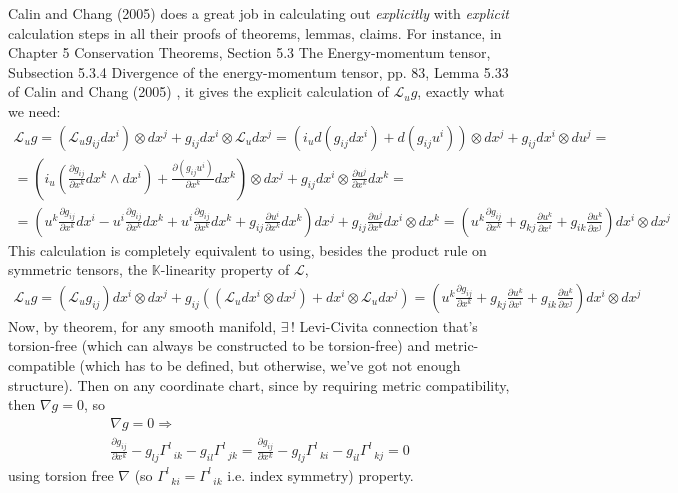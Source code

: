 \documentclass[twoside,landscape,10pt]{amsart}
\theoremstyle{plain}
\theoremstyle{definition}
\theoremstyle{remark}
\theoremstyle{remark}
\begin{document}
\begin{multicols*}{2}
Calin and Chang (2005) \cite{OCalinDChang2005} does a great job in calculating out \emph{explicitly} with \emph{explicit} calculation steps in all their proofs of theorems, lemmas, claims.  For instance, in Chapter 5 Conservation Theorems, Section 5.3 The Energy-momentum tensor, Subsection 5.3.4 Divergence of the energy-momentum tensor, pp. 83, Lemma 5.33 of Calin and Chang (2005) \cite{OCalinDChang2005}, it gives the explicit calculation of $\mathcal{L}_ug$, exactly what we need:
\[
\begin{gathered}
  \mathcal{L}_ug = ( \mathcal{L}_u g_{ij} dx^i ) \otimes dx^j + g_{ij} dx^i \otimes \mathcal{L}_u dx^j = (i_u d(g_{ij} dx^i ) + d(g_{ij}u^i )) \otimes dx^j + g_{ij}dx^i \otimes du^j = \\ 
   = (i_u \left( \frac{ \partial g_{ij}}{ \partial x^k} dx^k \wedge dx^i \right) + \frac{ \partial (g_{ij}u^i )}{ \partial x^k} dx^k ) \otimes dx^j + g_{ij} dx^i \otimes \frac{ \partial u^j}{ \partial x^k} dx^k  = \\
  = \left( u^k \frac{ \partial g_{ij}}{ \partial x^k} dx^i - u^i \frac{ \partial g_{ij} }{ \partial x^k} dx^k + u^i \frac{ \partial g_{ij}}{ \partial x^k } dx^k + g_{ij} \frac{ \partial u^i }{ \partial x^k} dx^k \right) dx^j + g_{ij} \frac{ \partial u^j }{ \partial x^k} dx^i \otimes dx^k = \left( u^k \frac{ \partial g_{ij}}{ \partial x^k} + g_{kj} \frac{ \partial u^k}{ \partial x^i } + g_{ik} \frac{ \partial u^k}{ \partial x^j} \right) dx^i \otimes dx^j
\end{gathered}
\]
This calculation is completely equivalent to using, besides the product rule on symmetric tensors, the $\mathbb{K}$-linearity property of $\mathcal{L}$,
\begin{equation}\label{Eq:Liederivativeofthemetric}
\begin{gathered}
  \mathcal{L}_u g = (\mathcal{L}_u g_{ij}) dx^i \otimes dx^j + g_{ij} (( \mathcal{L}_u dx^i \otimes dx^j ) + dx^i \otimes \mathcal{L}_u dx^j ) = (u^k \frac{ \partial g_{ij}}{ \partial x^k} + g_{kj} \frac{ \partial u^k}{ \partial x^i} + g_{ik} \frac{ \partial u^k }{ \partial x^j} ) dx^i \otimes dx^j
\end{gathered}
\end{equation}
Now, by theorem, for any smooth manifold, $\exists \, !$ Levi-Civita connection that's torsion-free (which can always be constructed to be torsion-free) and metric-compatible (which has to be defined, but otherwise, we've got not enough structure).  Then on any coordinate chart, since by requiring metric compatibility, then $\nabla g = 0$, so
\[
\begin{gathered}
  \nabla g= 0 \Longrightarrow \\ 
  \frac{ \partial g_{ij}}{ \partial x^k} - g_{lj} \Gamma^l_{ \; \; ik } - g_{il } \Gamma^l_{ \; \; jk} = \frac{ \partial g_{ij} }{ \partial x^k} - g_{lj} \Gamma^l_{ \; \; ki} - g_{il } \Gamma^l_{ \; \; kj} = 0 
\end{gathered}
\]
using torsion free $\nabla$ (so $\Gamma^l_{ \; \; ki} = \Gamma^l_{ \; \; ik}$ i.e. index symmetry) property.    


\end{multicols*}
\end{document}
